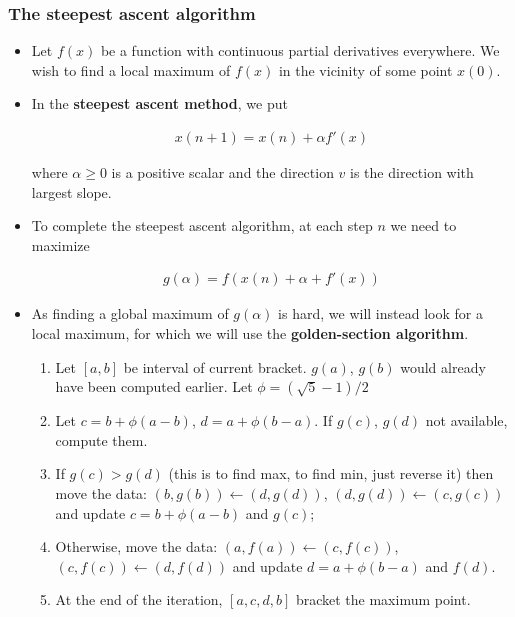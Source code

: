 \documentclass[10pt]{beamer}
\begin{document}
\begin{frame}[allowframebreaks]
  \frametitle{The steepest ascent algorithm}

  \begin{itemize}
  \item Let $f(x)$ be a function with continuous partial derivatives everywhere.  We wish
    to find a local maximum of $f(x)$ in the vicinity of some point $x(0)$.

  \item In the \textbf{steepest ascent method}, we put

    \begin{align*}
x(n + 1) = x(n) + \alpha f'(x)
    \end{align*}

    where $\alpha\geq 0$ is a positive scalar and the direction $v$ is the direction with
    largest slope.


  \item To complete the steepest ascent algorithm, at each step $n$ we need to maximize

    \begin{align*}
      g(\alpha) = f(x(n) + \alpha + f'(x))
    \end{align*}

  \newpage
  \item As finding a global maximum of $g(\alpha)$ is hard, we will instead look for a
    local maximum, for which we will use the \textbf{golden-section algorithm}.

    \begin{enumerate}
    \item Let $[a, b]$ be interval of current bracket. $g(a)$, $g(b)$ would already have
      been computed earlier. Let $\phi = (\sqrt{5}-1)/2$

    \item Let $c = b + \phi (a - b)$, $d = a + \phi (b - a)$. If $g(c)$, $g(d)$ not available,
      compute them.

    \item If $g(c) > g(d)$ (this is to find max, to find min, just reverse it) then move
      the data: $(b, g(b)) \leftarrow (d, g(d))$, $(d, g(d)) \leftarrow (c, g(c))$ and
      update $c = b + \phi (a - b)$ and $g(c)$;

    \item Otherwise, move the data: $(a, f(a)) \leftarrow (c, f(c))$,
      $(c, f(c)) \leftarrow (d, f(d))$ and update $d = a + \phi (b - a)$ and $f(d)$.

    \item At the end of the iteration, $[a, c, d, b]$ bracket the maximum point.

    \end{enumerate}


  \end{itemize}

\end{frame}
\end{document}
